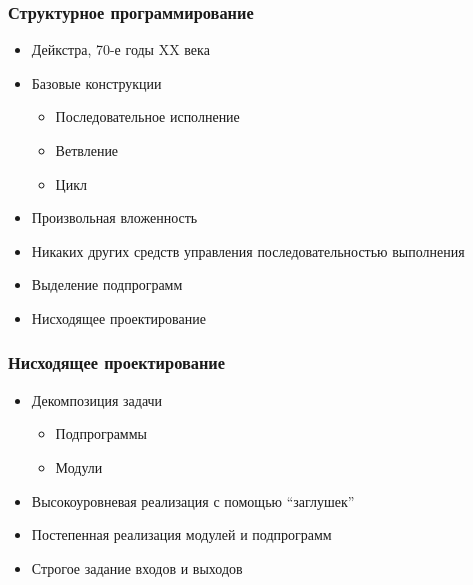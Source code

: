 \documentclass{../../slides-style}
\begin{document}
    \begin{frame}
        \frametitle{Структурное программирование}
        \begin{itemize}
            \item Дейкстра, 70-е годы XX века
            \item Базовые конструкции
            \begin{itemize}
                \item Последовательное исполнение
                \item Ветвление
                \item Цикл
            \end{itemize}
            \item Произвольная вложенность
            \item Никаких других средств управления последовательностью выполнения
            \item Выделение подпрограмм
            \item Нисходящее проектирование
        \end{itemize}
    \end{frame}

    \begin{frame}
        \frametitle{Нисходящее проектирование}
        \begin{itemize}
            \item Декомпозиция задачи
            \begin{itemize}
                \item Подпрограммы
                \item Модули
            \end{itemize}
            \item Высокоуровневая реализация с помощью ``заглушек''
            \item Постепенная реализация модулей и подпрограмм
            \item Строгое задание входов и выходов
        \end{itemize}
    \end{frame}
\end{document}
